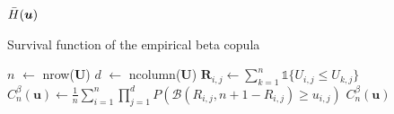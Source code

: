 \documentclass[12pt]{report}
\newcommand{\1}{\mathbf{1}}
\begin{document}
\begin{flushleft}
\begin{algorithm}[H]
\begin{algorithmic}
    \State \Return $\Bar{H}(\boldsymbol{u})$
\EndProcedure
\end{algorithmic}
\end{algorithm}

\begin{algorithm}[H]
\caption{Survival function of the empirical beta copula}
\begin{algorithmic}
    \State $n$ $\gets$ nrow($\boldsymbol{U}$)
    \State $d$ $\gets$ ncolumn($\boldsymbol{U}$)
            \State $\boldsymbol{R}_{i,j} \gets \sum\limits_{k = 1}^{n} \mathds{1} \{ U_{i,j} \le U_{k,j} \}$
        \EndFor
    \EndFor
    \State $C^{\beta}_{n}(\boldsymbol{u}) \gets \frac{1}{n}\sum\limits_{i = 1}^{n} \prod\limits_{j = 1}^{d} P(\mathcal{B}(R_{i,j}, n + 1 - R_{i,j}) \ge u_{i,j})$
    \State \Return $C^{\beta}_{n}(\boldsymbol{u})$
\EndProcedure
\end{algorithmic}
\end{algorithm}


\end{flushleft}
\end{document}
